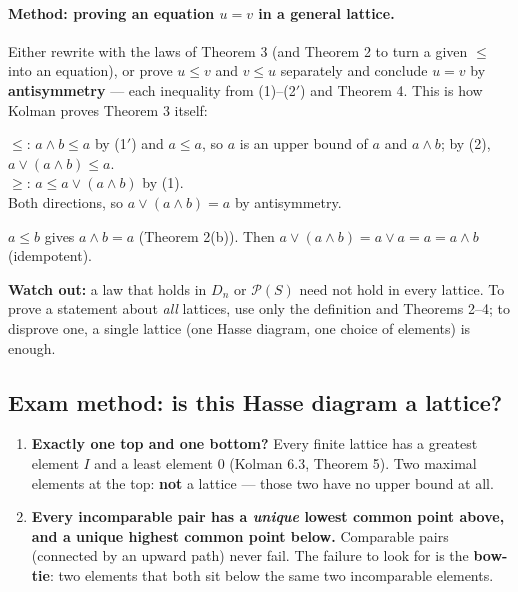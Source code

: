 \documentclass{fkt-notes}
\theoremstyle{definition}
\begin{document}
\paragraph{Method: proving an equation $u=v$ in a general lattice.}
%
Either rewrite with the laws of Theorem 3 (and Theorem 2 to turn a given
$\le$ into an equation), or prove $u\le v$ and $v\le u$ separately and
conclude $u=v$ by \textbf{antisymmetry} --- each inequality from (1)--(2$'$)
and Theorem 4. This is how Kolman proves Theorem 3 itself:

\begin{example}[Absorption $a\vee(a\wedge b)=a$ (Kolman's proof of Theorem 3, 4(a))]
  $\le$: $a\wedge b\le a$ by (1$'$) and $a\le a$, so $a$ is an upper bound
  of $a$ and $a\wedge b$; by (2), $a\vee(a\wedge b)\le a$.\\
  $\ge$: $a\le a\vee(a\wedge b)$ by (1).\\
  Both directions, so $a\vee(a\wedge b)=a$ by antisymmetry.
\end{example}

\begin{example}[A two-line proof with Theorem 2: if $a\le b$, then $a\vee(a\wedge b)=a\wedge b$]
  $a\le b$ gives $a\wedge b=a$ (Theorem 2(b)). Then
  $a\vee(a\wedge b)=a\vee a=a=a\wedge b$ (idempotent).
\end{example}

\textbf{Watch out:} a law that holds in $D_n$ or $\mathcal P(S)$ need not
hold in every lattice. To prove a statement about \emph{all} lattices,
use only the definition and Theorems 2--4; to disprove one, a single
lattice (one Hasse diagram, one choice of elements) is enough.

\subsection{Exam method: is this Hasse diagram a lattice?}
%
%
\begin{enumerate}[nosep]
  \item \textbf{Exactly one top and one bottom?} Every finite lattice
        has a greatest element $I$ and a least element $0$ (Kolman 6.3,
        Theorem 5). Two maximal elements at the top: \textbf{not} a
        lattice --- those two have no upper bound at all.
  \item \textbf{Every incomparable pair has a \emph{unique} lowest
          common point above, and a unique highest common point below.}
        Comparable pairs (connected by an upward path) never fail.
        The failure to look for is the \textbf{bow-tie}: two elements
        that both sit below the same two incomparable elements.
\end{enumerate}
\end{document}
